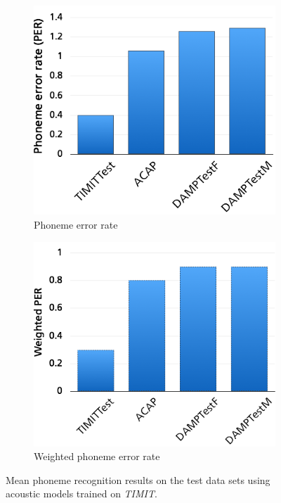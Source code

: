 \begin{figure}
	\centering
	\begin{subfigure}[t]{0.5\textwidth}
		\includegraphics[width=\textwidth]{images/res_timit_per.png}
		\caption{Phoneme error rate}
		
	\end{subfigure}%
	\begin{subfigure}[t]{0.5\textwidth}
		\includegraphics[width=\textwidth]{images/res_timit_wper.png}
		\caption{Weighted phoneme error rate}
	\end{subfigure}
	\caption{Mean phoneme recognition results on the test data sets using acoustic models trained on \textit{TIMIT}.}\label{fig:res_timit}
\end{figure}



